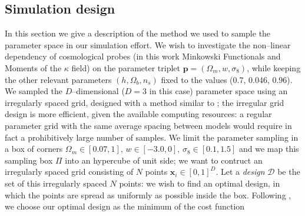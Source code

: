\documentclass[reprint,aps,prd,superscriptaddress,showkeys,showpacs]{revtex4-1}
\begin{document}
\subsection{Simulation design}
In this section we give a description of the method we used to sample the parameter space in our simulation effort. We wish to investigate the non--linear dependency of cosmological probes (in this work Minkowski Functionals and Moments of the $\kappa$ field) on the parameter triplet $\mathbf{p}=(\Omega_m,w,\sigma_8)$, while keeping the other relevant parameters $(h,\Omega_b,n_s)$ fixed to the values (0.7, 0.046, 0.96). We sampled the $D$--dimensional ($D=3$ in this case) parameter space using an irregularly spaced grid, designed with a method similar to \citep{coyote2}; the irregular grid design is more efficient, given the available computing resources: a regular parameter grid with the same average spacing between models would require in fact a prohibitively large number of samples. We limit the parameter sampling in a box of corners $\Omega_m\in[0.07,1],\,w\in[-3.0,0],\,\sigma_8\in[0.1,1.5]$ and we map this sampling box $\Pi$ into an hypercube of unit side; we want to contruct an irregularly spaced grid consisting of $N$ points $\mathbf{x}_i\in[0,1]^D$. Let a \textit{design} $\mathcal{D}$ be the set of this irregularly spaced $N$ points: we wish to find an optimal design, in which the points are spread as uniformly as possible inside the box. Following \citep{coyote2}, we choose our optimal design as the minimum of the cost function

\end{document}
